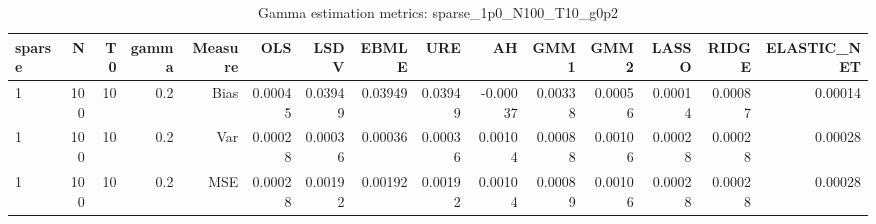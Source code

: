 \begin{table}[!htbp]\centering
\caption{Gamma estimation metrics: sparse_1p0_N100_T10_g0p2}
\label{tab:table1_sparse_1p0_N100_T10_g0p2}
\begin{tabular}{lrrrrrrrrrrrrrr}
\hline
sparse & N & T0 & gamma & Measure & OLS & LSDV & EBMLE & URE & AH & GMM1 & GMM2 & LASSO & RIDGE & ELASTIC_NET \\
\hline
1 & 100 & 10 & 0.2 & Bias & 0.00045 & 0.03949 & 0.03949 & 0.03949 & -0.00037 & 0.00338 & 0.00056 & 0.00014 & 0.00087 & 0.00014 \\
1 & 100 & 10 & 0.2 & Var & 0.00028 & 0.00036 & 0.00036 & 0.00036 & 0.00104 & 0.00088 & 0.00106 & 0.00028 & 0.00028 & 0.00028 \\
1 & 100 & 10 & 0.2 & MSE & 0.00028 & 0.00192 & 0.00192 & 0.00192 & 0.00104 & 0.00089 & 0.00106 & 0.00028 & 0.00028 & 0.00028 \\
\hline
\end{tabular}
\end{table}

